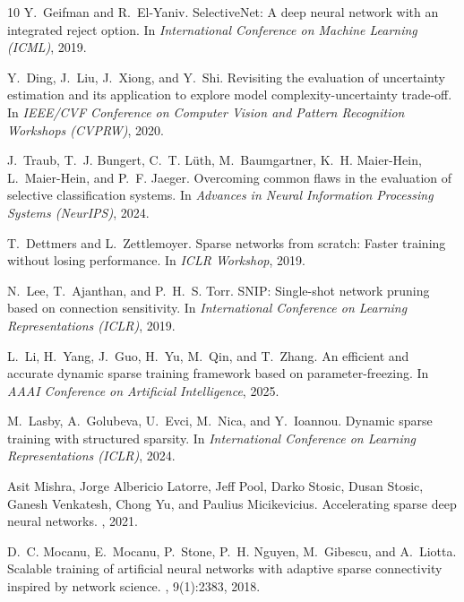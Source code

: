 \documentclass[letterpaper]{article} %
\begin{document}
\begin{thebibliography}{10}
Y.~Geifman and R.~El-Yaniv.
\newblock SelectiveNet: A deep neural network with an integrated reject option.
\newblock In {\em International Conference on Machine Learning (ICML)}, 2019.

Y.~Ding, J.~Liu, J.~Xiong, and Y.~Shi.
\newblock Revisiting the evaluation of uncertainty estimation and its application to explore model complexity-uncertainty trade-off.
\newblock In {\em IEEE/CVF Conference on Computer Vision and Pattern Recognition Workshops (CVPRW)}, 2020.

J.~Traub, T.~J. Bungert, C.~T. L{\"u}th, M.~Baumgartner, K.~H. Maier-Hein, L.~Maier-Hein, and P.~F. Jaeger.
\newblock Overcoming common flaws in the evaluation of selective classification systems.
\newblock In {\em Advances in Neural Information Processing Systems (NeurIPS)}, 2024.

T.~Dettmers and L.~Zettlemoyer.
\newblock Sparse networks from scratch: Faster training without losing performance.
\newblock In {\em ICLR Workshop}, 2019.

N.~Lee, T.~Ajanthan, and P.~H.~S. Torr.
\newblock SNIP: Single-shot network pruning based on connection sensitivity.
\newblock In {\em International Conference on Learning Representations (ICLR)}, 2019.

L.~Li, H.~Yang, J.~Guo, H.~Yu, M.~Qin, and T.~Zhang.
\newblock An efficient and accurate dynamic sparse training framework based on parameter-freezing.
\newblock In {\em AAAI Conference on Artificial Intelligence}, 2025.

M.~Lasby, A.~Golubeva, U.~Evci, M.~Nica, and Y.~Ioannou.
\newblock Dynamic sparse training with structured sparsity.
\newblock In {\em International Conference on Learning Representations (ICLR)}, 2024.

Asit Mishra, Jorge Albericio Latorre, Jeff Pool, Darko Stosic, Dusan Stosic, Ganesh Venkatesh, Chong Yu, and Paulius Micikevicius.
\newblock Accelerating sparse deep neural networks.
, 2021.

D.~C. Mocanu, E.~Mocanu, P.~Stone, P.~H. Nguyen, M.~Gibescu, and A.~Liotta.
\newblock Scalable training of artificial neural networks with adaptive sparse connectivity inspired by network science.
, 9(1):2383, 2018.


\end{thebibliography}
\end{document}
